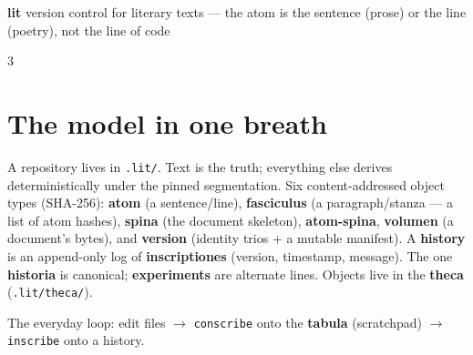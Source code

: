 \documentclass[9pt]{extarticle}
\newcommand{\ci}[1]{\texttt{#1}}                       %
\begin{document}
\raggedright

{\LARGE\bfseries\color{accent} lit}%
\hfill{\footnotesize\color{faint} version control for literary texts — the atom is the sentence (prose) or the line (poetry), not the line of code}

\vspace{4pt}

\begin{multicols}{3}

\section{The model in one breath}
A repository lives in \ci{.lit/}. Text is the truth; everything
else derives deterministically under the pinned segmentation.
Six content-addressed object types (SHA-256): \textbf{atom}
(a sentence/line), \textbf{fasciculus} (a paragraph/stanza — a
list of atom hashes), \textbf{spina} (the document skeleton),
\textbf{atom-spina}, \textbf{volumen} (a document's bytes), and
\textbf{version} (identity trios + a mutable manifest). A
\textbf{history} is an append-only log of \textbf{inscriptiones}
(version, timestamp, message). The one \textbf{historia} is
canonical; \textbf{experiments} are alternate lines. Objects
live in the \textbf{theca} (\ci{.lit/theca/}).

The everyday loop: edit files $\rightarrow$ \ci{conscribe} onto
the \textbf{tabula} (scratchpad) $\rightarrow$ \ci{inscribe}
onto a history.


\end{multicols}
\end{document}
